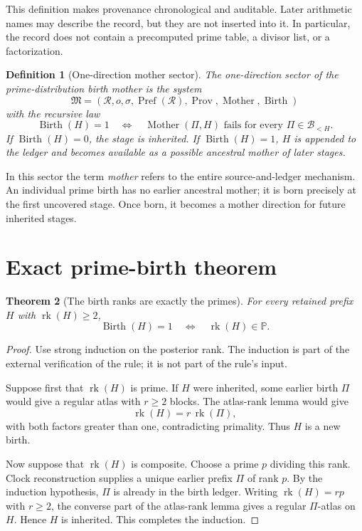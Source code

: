 \documentclass[11pt]{article}
\newtheorem{theorem}{Theorem}[section]
\newtheorem{definition}[theorem]{Definition}
\newcommand{\Pref}{\operatorname{Pref}}
\newcommand{\rk}{\operatorname{rk}}
\newcommand{\Birth}{\operatorname{Birth}}
\newcommand{\Prov}{\operatorname{Prov}}
\newcommand{\Mother}{\operatorname{Mother}}
\newcommand{\PP}{\mathbb P}
\begin{document}
This definition makes provenance chronological and auditable.  Later
arithmetic names may describe the record, but they are not inserted into it.
In particular, the record does not contain a precomputed prime table, a
divisor list, or a factorization.

\begin{definition}[One-direction mother sector]
The \emph{one-direction sector} of the prime-distribution birth mother is
the system
\[
\mathfrak M
=
(\mathscr R,o,\sigma,\Pref(\mathscr R),\Prov,\Mother,\Birth)
\]
with the recursive law
\[
\boxed{
\Birth(H)=1
\quad\Longleftrightarrow\quad
\Mother(\Pi,H)\text{ fails for every }\Pi\in\mathcal B_{<H}.
}
\]
If $\Birth(H)=0$, the stage is inherited.  If $\Birth(H)=1$, $H$ is appended
to the ledger and becomes available as a possible ancestral mother of later
stages.
\end{definition}

In this sector the term \emph{mother} refers to the entire
source-and-ledger mechanism.  An
individual prime birth has no earlier ancestral mother; it is born precisely
at the first uncovered stage.  Once born, it becomes a mother direction for
future inherited stages.

\section{Exact prime-birth theorem}

\begin{theorem}[The birth ranks are exactly the primes]
\label{thm:single}
For every retained prefix $H$ with $\rk(H)\ge2$,
\[
\boxed{
\Birth(H)=1
\quad\Longleftrightarrow\quad
\rk(H)\in\PP.
}
\]
\end{theorem}

\begin{proof}
Use strong induction on the posterior rank.  The induction is part of the
external verification of the rule; it is not part of the rule's input.

Suppose first that $\rk(H)$ is prime.  If $H$ were inherited, some earlier
birth $\Pi$ would give a regular atlas with $r\ge2$ blocks.  The atlas-rank
lemma would give
\[
\rk(H)=r\,\rk(\Pi),
\]
with both factors greater than one, contradicting primality.  Thus $H$ is a
new birth.

Now suppose that $\rk(H)$ is composite.  Choose a prime $p$ dividing this
rank.  Clock reconstruction supplies a unique earlier prefix $\Pi$ of rank
$p$.  By the induction hypothesis, $\Pi$ is already in the birth ledger.
Writing $\rk(H)=rp$ with $r\ge2$, the converse part of the atlas-rank lemma
gives a regular $\Pi$-atlas on $H$.  Hence $H$ is inherited.  This completes
the induction.
\end{proof}
\end{document}
